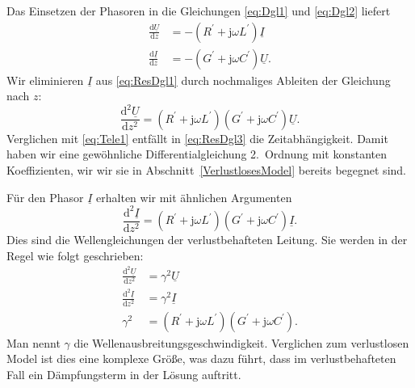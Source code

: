 \documentclass[paper=a4, parskip=half-, ngerman, fontsize=11pt]{scrreprt}
\begin{document}
Das Einsetzen der Phasoren in die Gleichungen \eqref{eq:Dgl1} und \eqref{eq:Dgl2} liefert
\begin{align}
    \frac{\text{d} \underline{U}}{\text{d} z} &= - \left( R^{\prime} + \mathrm{j} \omega L^{\prime} \right)
    \underline{I} \label{eq:ResDgl1} \\[1ex]
    \frac{\text{d} \underline{I}}{\text{d} z} &= - \left( G^{\prime} + \mathrm{j} \omega C^{\prime} \right)
    \underline{U}.
\end{align}
Wir eliminieren $\underline{I}$ aus \eqref{eq:ResDgl1} durch nochmaliges Ableiten der Gleichung nach $z$:
\begin{equation}
    \frac{\text{d}^{2} \underline{U}}{\text{d} z^{2}} = \left( R^{\prime} + \mathrm{j} \omega L^{\prime} \right)
    \left( G^{\prime} + \mathrm{j} \omega C^{\prime} \right) \underline{U} \label{eq:ResDgl3}.
\end{equation}
Verglichen mit \eqref{eq:Tele1} entfällt in \eqref{eq:ResDgl3} die Zeitabhängigkeit. Damit haben wir eine gewöhnliche
Differentialgleichung 2.~Ordnung mit konstanten Koeffizienten, wir wir sie in Abschnitt~\ref{VerlustlosesModel} bereits
begegnet sind.

Für den Phasor $\underline{I}$ erhalten wir mit ähnlichen Argumenten
\begin{equation*}
    \frac{\text{d}^{2} \underline{I}}{\text{d} z^{2}} = \left( R^{\prime} + \mathrm{j} \omega L^{\prime} \right)
    \left( G^{\prime} + \mathrm{j} \omega C^{\prime} \right) \underline{I}.
\end{equation*}
Dies sind die Wellengleichungen der verlustbehafteten Leitung. Sie werden in der Regel wie folgt geschrieben:
\begin{align}
    \frac{\text{d}^{2} \underline{U}}{\text{d} z^{2}} &= \gamma^{2} \underline{U} \label{eq:VerlustDgl1} \\[1ex]
    \frac{\text{d}^{2} \underline{I}}{\text{d} z^{2}} &= \gamma^{2} \underline{I} \label{eq:VerlustDgl2} \\[1ex]
    \gamma^{2} &= \left( R^{\prime} + \mathrm{j} \omega L^{\prime} \right) \left( G^{\prime} + \mathrm{j} \omega
    C^{\prime} \right) \label{eq:Gamma}.
\end{align}
Man nennt $\gamma$ die Wellenausbreitungsgeschwindigkeit. Verglichen zum verlustlosen Model ist dies eine komplexe
Größe, was dazu führt, dass im verlustbehafteten Fall ein Dämpfungsterm in der Lösung auftritt.
\end{document}
